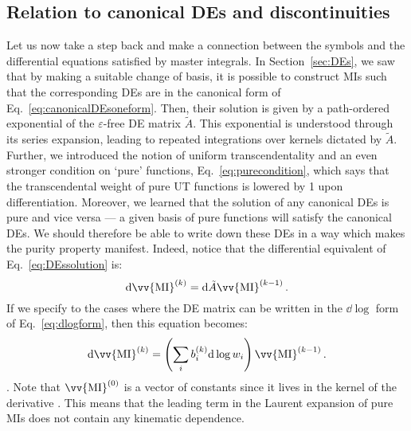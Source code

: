 \documentclass[main.tex]{subfiles}
\begin{document}
\subsection{Relation to canonical DEs and discontinuities}
Let us now take a step back and make a connection between the symbols and the differential equations satisfied by master integrals. In Section~\ref{sec:DEs}, we saw that by making a suitable change of basis, it is possible to construct MIs such that the corresponding DEs are in the canonical form of Eq.~\ref{eq:canonicalDEsoneform}. Then, their solution is given by a path-ordered exponential of the $\varepsilon$-free DE matrix $\tilde{A}$. This exponential is understood through its series expansion, leading to repeated integrations over kernels dictated by $\tilde{A}$. Further, we introduced the notion of uniform transcendentality and an even stronger condition on `pure' functions, Eq.~\ref{eq:purecondition}, which says that the transcendental weight of pure UT functions is lowered by 1 upon differentiation. Moreover, we learned that the solution of any canonical DEs is pure and vice versa --- a given basis of pure functions will satisfy the canonical DEs. We should therefore be able to write down these DEs in a way which makes the purity property manifest. Indeed, notice that the differential equivalent of Eq.~\ref{eq:DEssolution} is:
\begin{equation}
    \dd \vv{\text{MI}}^{(k)} = \dd \tilde{A} \vv{\text{MI}}^{(k-1)}\,.
\end{equation}
If we specify to the cases where the DE matrix can be written in the $\dd \log$ form of Eq.~\ref{eq:dlogform}, then this equation becomes:
\begin{equation} \label{eq:pureMIDEs}
    \dd \vv{\text{MI}}^{(k)} = \left( \sum_i b_i^{(k)} \dd \log w_i  \right)\vv{\text{MI}}^{(k-1)}\,.
\end{equation}
. Note that $\vv{\text{MI}}^{(0)}$ is a vector of constants since it lives in the kernel of the derivative . This means that the leading term in the Laurent expansion of pure MIs does not contain any kinematic dependence. 
\end{document}
